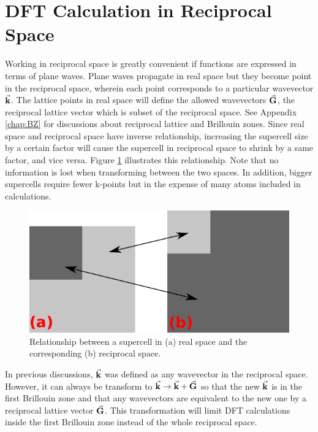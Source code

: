 \section{DFT Calculation in Reciprocal Space}
Working in reciprocal space is greatly convenient if functions are expressed in terms of plane waves. Plane waves propagate in real space but they become point in the reciprocal space, wherein each point corresponds to a particular wavevector $\va{k}$. The lattice points in real space will define the allowed wavevectors $ \va{G}$, the reciprocal lattice vector which is subset of the reciprocal space. See Appendix \ref{chap:BZ} for discussions about reciprocal lattice and Brillouin zones. Since real space and reciprocal space have inverse relationship, increasing the supercell size by a certain factor will cause the supercell in reciprocal space to shrink by  a same factor, and vice versa. Figure \ref{fig:reciprocal} illustrates this relationship. Note that no information is lost when transforming between the two spaces. In addition, bigger supercells require fewer k-points but in the expense of many atoms included in calculations.
\begin{figure}[tbh!]
	\centering
	\includegraphics[width=0.5\linewidth]{"images/computational/reciprocal"}
	\caption[Relationship between a supercell in real space and reciprocal space]{Relationship between a supercell in (a) real space and the corresponding (b) reciprocal space.}
	\label{fig:reciprocal}
\end{figure}

In previous discussions,  $\va{k}$ was defined as any wavevector in the reciprocal space. However, it can always be transform to $\va{k} \rightarrow \va{k} + \va{G} $ so that the new $\va{k}$ is in the first Brillouin zone and that any wavevectors are equivalent to the new one by a reciprocal lattice vector $\va{G}$.  This transformation will limit DFT calculations inside the first Brillouin zone instead of the whole reciprocal space.

